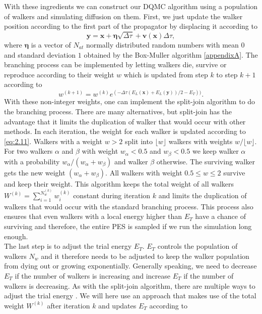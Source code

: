 \documentclass [12pt]{report}
\begin{document}
With these ingredients we can construct our DQMC algorithm using a population of walkers and simulating diffusion on them. First, we just update the walker position according to the first part of the propagator by displacing it according to
\begin{equation}\label{eq:2.10}
\bm{y} = \bm{x} + \bm{\eta}\sqrt{\Delta \tau} + \bm{v}(\bm{x})\Delta \tau,
\end{equation}
where $\bm{\eta}$ is a vector of $N_{at}$ normally distributed random numbers with mean $0$ and standard deviation $1$ obtained by the Box-Muller algorithm \ref{appendixA}.
The branching process can be implemented by letting walkers die, survive or reproduce according to their weight $w$ which is updated from step $k$ to step $k+1$ according to 
\begin{equation}\label{eq:2.11} 
w^{(k+1)} = w^{(k)} e^{(-\Delta \tau (E_L(\bm{x}) + E_L(\bm{y}))/2 - E_T))}.
\end{equation}
With these non-integer weights, one can implement the split-join algorithm \cite{split_join} to do the branching process. There are many alternatives, but split-join has the advantage that it limits the duplication of walker that would occur with other methods.
 In each iteration, the weight for each walker is updated according to \eqref{eq:2.11}. Walkers with a weight $w > 2$ split into $\lfloor w \rfloor$ walkers with weights $w/\lfloor w \rfloor$. For two walkers $\alpha$ and $\beta$ with weight $w_\alpha < 0.5$ and $w_\beta < 0.5$ we keep walker $\alpha$  with a probability $w_\alpha/(w_\alpha + w_\beta)$ and walker $\beta$ otherwise. The surviving walker gets the new weight $(w_\alpha + w_\beta)$. All walkers with weight $0.5 \leq w \leq 2$ survive and keep their weight. This algorithm keeps the total weight of all walkers $W^{(k)} =  \sum_{i = 1}^{N_w^{(k)}} w_i^{(k)}$ constant during iteration $k$ and limits the duplication of walkers that would occur with the standard branching process.
 This process also ensures that even walkers with a local energy higher than $E_T$ have a chance of surviving and therefore, the entire PES is sampled if we run the simulation long enough. \\
The last step is to adjust the trial energy $E_T$. $E_T$ controls the population of walkers $N_w$ and it therefore needs to be adjusted to keep the walker population from dying out or growing exponentially. Generally speaking, we need to decrease $E_T$ if the number of walkers is increasing and increase $E_T$ if the number of walkers is decreasing.  As with the split-join algorithm, there are multiple ways to adjust the trial energy \cite{mccoy,alavi}. We will here use an approach \cite{cyrus} that makes use of the total weight $W^{(k)}$ after iteration $k$ and updates $E_T$ according to
\end{document}
